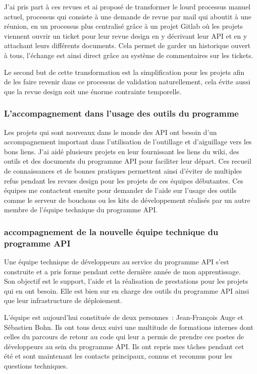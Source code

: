         J’ai pris part à ces revues et ai proposé de transformer le lourd processus manuel actuel, processus qui consiste à une demande de revue par mail qui aboutit à une réunion, en un processus plus centralisé grâce à un projet Gitlab où les projets viennent ouvrir un ticket pour leur revue design en y décrivant leur API et en y attachant leurs différents documents.
        Cela permet de garder un historique ouvert à tous, l’échange est ainsi direct grâce au système de commentaires sur les tickets.

        Le second but de cette transformation est la simplification pour les projets afin de les faire revenir dans ce processus de validation naturellement, cela évite aussi que la revue design soit une énorme contrainte temporelle.

        \subsubsection{L'accompagnement dans l’usage des outils du programme}

        Les projets qui sont nouveaux dans le monde des API ont besoin d’un accompagnement important dans l’utilisation de l’outillage et d’aiguillage vers les bons liens.
        J’ai aidé plusieurs projets en leur fournissant les liens du wiki, des outils et des documents du programme API pour faciliter leur départ.
        Ces recueil de connaissances et de bonnes pratiques permettent ainsi d’éviter de multiples refus pendant les revues design pour les projets de ces équipes débutantes.
        Ces équipes me contactent ensuite pour demander de l’aide sur l’usage des outils comme le serveur de bouchons ou les kits de développement réalisés par un autre membre de l’équipe technique du programme API.

        \subsubsection{accompagnement de la nouvelle équipe technique du programme API}

        Une équipe technique de développeurs au service du programme API s’est construite et a pris forme pendant cette dernière année de mon apprentissage.
        Son objectif est le support, l’aide et la réalisation de prestations pour les projets qui en ont besoin.
        Elle est bien sur en charge des outils du programme API ainsi que leur infrastructure de déploiement.

        L’équipe est aujourd’hui constituée de deux personnes : Jean-François Auge et Sébastien Bohn.
        Ils ont tous deux suivi une multitude de formations internes dont celles du parcours de retour au code qui leur a permis de prendre ces postes de développeurs au sein du programme API.
        Ils ont repris mes tâches pendant cet été et sont maintenant les contacts principaux, connus et reconnus pour les questions techniques.

